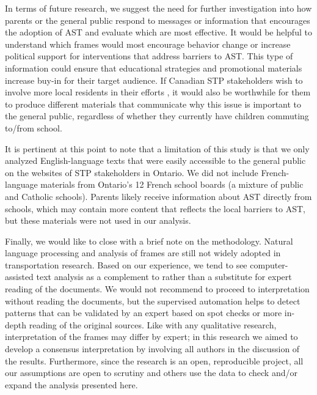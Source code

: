 \documentclass[preprint, 3p,
authoryear]{elsarticle} %
\begin{document}
In terms of future research, we suggest the need for further
investigation into how parents or the general public respond to messages
or information that encourages the adoption of AST and evaluate which
are most effective. It would be helpful to understand which frames would
most encourage behavior change or increase political support for
interventions that address barriers to AST. This type of information
could ensure that educational strategies and promotional materials
increase buy-in for their target audience. If Canadian STP stakeholders
wish to involve more local residents in their efforts
\citep{buttazzoniSupportingActiveSchool2018}, it would also be
worthwhile for them to produce different materials that communicate why
this issue is important to the general public, regardless of whether
they currently have children commuting to/from school.

It is pertinent at this point to note that a limitation of this study is
that we only analyzed English-language texts that were easily accessible
to the general public on the websites of STP stakeholders in Ontario. We
did not include French-language materials from Ontario's 12 French
school boards (a mixture of public and Catholic schools). Parents likely
receive information about AST directly from schools, which may contain
more content that reflects the local barriers to AST, but these
materials were not used in our analysis.

Finally, we would like to close with a brief note on the methodology.
Natural language processing and analysis of frames are still not widely
adopted in transportation research. Based on our experience, we tend to
see computer-assisted text analysis as a complement to rather than a
substitute for expert reading of the documents. We would not recommend
to proceed to interpretation without reading the documents, but the
supervised automation helps to detect patterns that can be validated by
an expert based on spot checks or more in-depth reading of the original
sources. Like with any qualitative research, interpretation of the
frames may differ by expert; in this research we aimed to develop a
consensus interpretation by involving all authors in the discussion of
the results. Furthermore, since the research is an open, reproducible
project, all our assumptions are open to scrutiny and others use the
data to check and/or expand the analysis presented here.

\renewcommand\refname{References}

\end{document}
